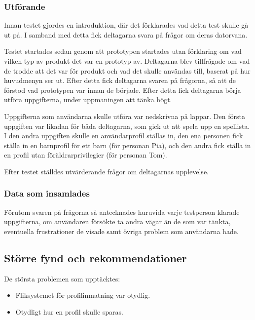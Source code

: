 \documentclass[a4paper,12pt,titlepage]{article}
\begin{document}
\subsubsection*{Utförande}

Innan testet gjordes en introduktion, där det förklarades vad detta test skulle
gå ut på. I samband med detta fick deltagarna svara på frågor om deras
datorvana.

Testet startades sedan genom att prototypen startades utan förklaring om vad
vilken typ av produkt det var en prototyp av. Deltagarna blev tillfrågade om vad
de trodde att det var för produkt och vad det skulle användas till,
baserat på hur huvudmenyn ser ut. Efter detta fick deltagarna svaren på
frågorna, så att de förstod vad prototypen var innan de började. Efter detta
fick deltagarna börja utföra uppgifterna, under uppmaningen att tänka högt.

Uppgifterna som användarna skulle utföra var nedskrivna på lappar. Den första
uppgiften var likadan för båda deltagarna, som gick ut att spela upp en
spellista. I den andra uppgiften skulle en användarprofil ställas in, den ena
personen fick ställa in en barnprofil för ett barn (för personan Pia), och den
andra fick ställa in en profil utan föräldrarprivilegier (för personan Tom).

Efter testet ställdes utvärderande frågor om deltagarnas upplevelse.

\subsubsection*{Data som insamlades}

Förutom svaren på frågorna så antecknades huruvida varje testperson klarade
uppgifterna, om användaren försökte ta andra vägar än de som var tänkta,
eventuella frustrationer de visade samt övriga problem som användarna hade.

\subsection*{Större fynd och rekommendationer}

De största problemen som upptäcktes:

\begin{itemize}
    \item Fliksystemet för profilinmatning var otydlig.
    \item Otydligt hur en profil skulle sparas.
\end{itemize}
\end{document}
